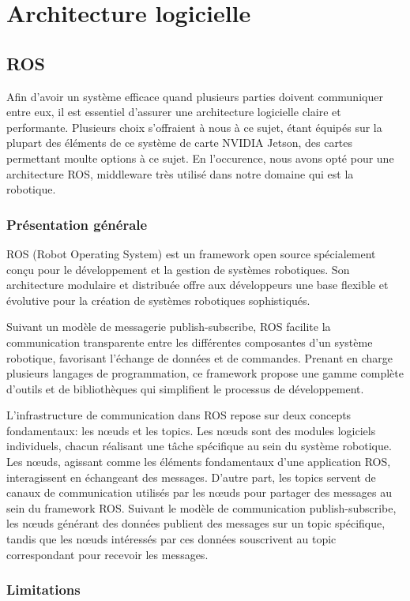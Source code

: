 \documentclass[12pt]{report}
\begin{document}
\chapter{Architecture logicielle}
\section{ROS}
Afin d'avoir un système efficace quand plusieurs parties doivent communiquer entre eux, il est essentiel
d'assurer une architecture logicielle claire et performante. Plusieurs choix s'offraient à nous à ce sujet,
étant équipés sur la plupart des éléments de ce système de carte NVIDIA Jetson, des cartes permettant moulte
options à ce sujet. En l'occurence, nous avons opté pour une architecture ROS, middleware très utilisé
dans notre domaine qui est la robotique.

\subsection{Présentation générale}
ROS (Robot Operating System) est un framework open source spécialement conçu pour le développement 
et la gestion de systèmes robotiques. Son architecture modulaire et distribuée offre aux développeurs
une base flexible et évolutive pour la création de systèmes robotiques sophistiqués.

Suivant un modèle de messagerie publish-subscribe, ROS facilite la communication transparente
entre les différentes composantes d'un système robotique, favorisant l'échange de données et de
commandes. Prenant en charge plusieurs langages de programmation, ce framework propose une
gamme complète d'outils et de bibliothèques qui simplifient le processus de développement.

L'infrastructure de communication dans ROS repose sur deux concepts fondamentaux: les nœuds
et les topics. Les nœuds sont des modules logiciels individuels, chacun réalisant une tâche spécifique
au sein du système robotique. Les nœuds, agissant comme les éléments fondamentaux d'une application ROS,
interagissent en échangeant des messages. D'autre part, les topics servent de canaux de communication
utilisés par les nœuds pour partager des messages au sein du framework ROS. Suivant
le modèle de communication publish-subscribe, les nœuds générant des données publient des messages sur
un topic spécifique, tandis que les nœuds intéressés par ces données souscrivent au topic correspondant
pour recevoir les messages.

\subsection{Limitations}
\end{document}
